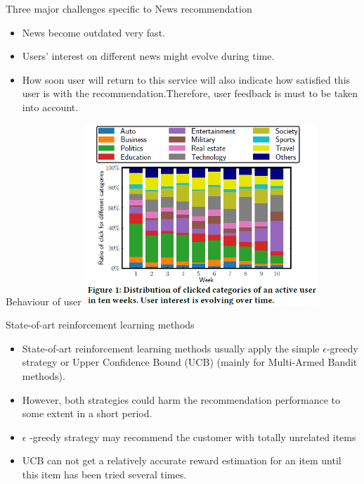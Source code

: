 \begin{frame}{Three major challenges specific to News recommendation}
   \begin{itemize}
       \item News become outdated very fast.
       \item Users’ interest on different news might evolve during time.
       \item How soon user will return to this service will also indicate how satisfied this user is with the recommendation.Therefore, user feedback is must to be taken into account.
       
\end{itemize}
\end{frame}

\begin{frame}{Behaviour of user}
\includegraphics[height=6.8cm]{figure 1.png}
\centering
\end{frame}


\begin{frame}{State-of-art reinforcement learning methods}
   \begin{itemize}
       \item State-of-art reinforcement learning methods usually apply the simple $\epsilon$-greedy strategy or Upper Confidence Bound (UCB) (mainly for Multi-Armed Bandit methods). 
       \item However, both strategies could harm the recommendation performance to some extent in a short period. 
       \item $\epsilon$ -greedy strategy may recommend the customer with totally unrelated items
       \item UCB can not get a relatively accurate reward estimation for an item until this item has been tried several times.
\end{itemize}
\end{frame}



